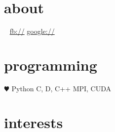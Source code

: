 \documentclass[]{fancy-cv}
\begin{document}
\header{\myfirstname}{\mylastname}
       {\mytitle}

\begin{aside}
  \section{about}
    \myaddress
    \mycity
    ~
    \href{mailto:\myemail}{\myemail}
    \href{\mywebsite}{\mywebsite}
    \href{http://facebook.com/\myfb}{fb://\myfb}
    \href{http://plug.google.com/\mygp}{google://\mygp}
  \section{programming}
    {\color{red} $\varheartsuit$} Python
    C, D, C++
    MPI, CUDA
\end{aside}

\section{interests}
\interests
\end{document}
